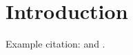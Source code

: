 \section{Introduction}
\label{sec:introduction}

Example citation: \citet{Bengio+chapter2007} and \citep{Hinton06}.

